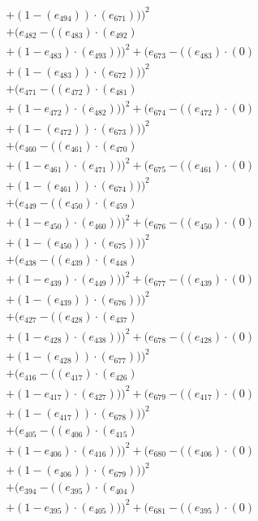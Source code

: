\documentclass[10pt, a4paper]{article}
\begin{document}
\begin{small}
\begin{align*}
& + (1 - (e_{494})) \cdot (e_{671})))^{2} \\
& + (e_{482} - ((e_{483})  \cdot  (e_{492}) \\
& + (1 - e_{483})  \cdot  (e_{493})))^{2} + (e_{673} - ((e_{483}) \cdot (0) \\
& + (1 - (e_{483})) \cdot (e_{672})))^{2} \\
& + (e_{471} - ((e_{472})  \cdot  (e_{481}) \\
& + (1 - e_{472})  \cdot  (e_{482})))^{2} + (e_{674} - ((e_{472}) \cdot (0) \\
& + (1 - (e_{472})) \cdot (e_{673})))^{2} \\
& + (e_{460} - ((e_{461})  \cdot  (e_{470}) \\
& + (1 - e_{461})  \cdot  (e_{471})))^{2} + (e_{675} - ((e_{461}) \cdot (0) \\
& + (1 - (e_{461})) \cdot (e_{674})))^{2} \\
& + (e_{449} - ((e_{450})  \cdot  (e_{459}) \\
& + (1 - e_{450})  \cdot  (e_{460})))^{2} + (e_{676} - ((e_{450}) \cdot (0) \\
& + (1 - (e_{450})) \cdot (e_{675})))^{2} \\
& + (e_{438} - ((e_{439})  \cdot  (e_{448}) \\
& + (1 - e_{439})  \cdot  (e_{449})))^{2} + (e_{677} - ((e_{439}) \cdot (0) \\
& + (1 - (e_{439})) \cdot (e_{676})))^{2} \\
& + (e_{427} - ((e_{428})  \cdot  (e_{437}) \\
& + (1 - e_{428})  \cdot  (e_{438})))^{2} + (e_{678} - ((e_{428}) \cdot (0) \\
& + (1 - (e_{428})) \cdot (e_{677})))^{2} \\
& + (e_{416} - ((e_{417})  \cdot  (e_{426}) \\
& + (1 - e_{417})  \cdot  (e_{427})))^{2} + (e_{679} - ((e_{417}) \cdot (0) \\
& + (1 - (e_{417})) \cdot (e_{678})))^{2} \\
& + (e_{405} - ((e_{406})  \cdot  (e_{415}) \\
& + (1 - e_{406})  \cdot  (e_{416})))^{2} + (e_{680} - ((e_{406}) \cdot (0) \\
& + (1 - (e_{406})) \cdot (e_{679})))^{2} \\
& + (e_{394} - ((e_{395})  \cdot  (e_{404}) \\
& + (1 - e_{395})  \cdot  (e_{405})))^{2} + (e_{681} - ((e_{395}) \cdot (0) \\

\end{align*}
\end{small}
\end{document}
